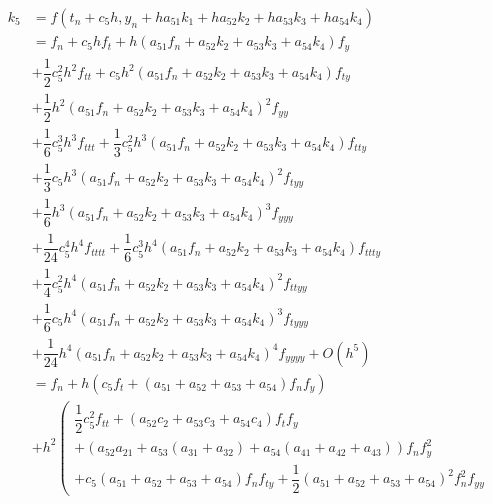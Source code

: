 \documentclass[a4paper,oneside]{book}
\numberwithin{equation}{chapter}
\begin{document}
\begin{align}
{k_5} &= f\left( {{t_n} + {c_5}h,{y_n} + h{a_{51}}{k_1} + h{a_{52}}{k_2} + h{a_{53}}{k_3} + h{a_{54}}{k_4}} \right)\\
& = {f_n} + {c_5}h{f_t} + h\left( {{a_{51}}{f_n} + {a_{52}}{k_2} + {a_{53}}{k_3} + {a_{54}}{k_4}} \right){f_y}\\
& + \dfrac{1}{2}c_5^2{h^2}{f_{tt}} + {c_5}{h^2}\left( {{a_{51}}{f_n} + {a_{52}}{k_2} + {a_{53}}{k_3} + {a_{54}}{k_4}} \right){f_{ty}}\\
& + \dfrac{1}{2}{h^2}{\left( {{a_{51}}{f_n} + {a_{52}}{k_2} + {a_{53}}{k_3} + {a_{54}}{k_4}} \right)^2}{f_{yy}}\\
& + \dfrac{1}{6}c_5^3{h^3}{f_{ttt}} + \dfrac{1}{3}c_5^2{h^3}\left( {{a_{51}}{f_n} + {a_{52}}{k_2} + {a_{53}}{k_3} + {a_{54}}{k_4}} \right){f_{tty}}\\
& + \dfrac{1}{3}{c_5}{h^3}{\left( {{a_{51}}{f_n} + {a_{52}}{k_2} + {a_{53}}{k_3} + {a_{54}}{k_4}} \right)^2}{f_{tyy}}\\
& + \dfrac{1}{6}{h^3}{\left( {{a_{51}}{f_n} + {a_{52}}{k_2} + {a_{53}}{k_3} + {a_{54}}{k_4}} \right)^3}{f_{yyy}}\\
& + \dfrac{1}{{24}}c_5^4{h^4}{f_{tttt}} + \dfrac{1}{6}c_5^3{h^4}\left( {{a_{51}}{f_n} + {a_{52}}{k_2} + {a_{53}}{k_3} + {a_{54}}{k_4}} \right){f_{ttty}}\\
& + \dfrac{1}{4}c_5^2{h^4}{\left( {{a_{51}}{f_n} + {a_{52}}{k_2} + {a_{53}}{k_3} + {a_{54}}{k_4}} \right)^2}{f_{ttyy}}\\
& + \dfrac{1}{6}{c_5}{h^4}{\left( {{a_{51}}{f_n} + {a_{52}}{k_2} + {a_{53}}{k_3} + {a_{54}}{k_4}} \right)^3}{f_{tyyy}}\\
& + \dfrac{1}{{24}}{h^4}{\left( {{a_{51}}{f_n} + {a_{52}}{k_2} + {a_{53}}{k_3} + {a_{54}}{k_4}} \right)^4}{f_{yyyy}} + O\left( {{h^5}} \right)\\
& = {f_n} + h\left( {{c_5}{f_t} + \left( {{a_{51}} + {a_{52}} + {a_{53}} + {a_{54}}} \right){f_n}{f_y}} \right)\\
& + {h^2}\left( \begin{array}{l}
\dfrac{1}{2}c_5^2{f_{tt}} + \left( {{a_{52}}{c_2} + {a_{53}}{c_3} + {a_{54}}{c_4}} \right){f_t}{f_y}\\
 + \left( {{a_{52}}{a_{21}} + {a_{53}}\left( {{a_{31}} + {a_{32}}} \right) + {a_{54}}\left( {{a_{41}} + {a_{42}} + {a_{43}}} \right)} \right){f_n}f_y^2\\
 + {c_5}\left( {{a_{51}} + {a_{52}} + {a_{53}} + {a_{54}}} \right){f_n}{f_{ty}} + \dfrac{1}{2}{\left( {{a_{51}} + {a_{52}} + {a_{53}} + {a_{54}}} \right)^2}f_n^2{f_{yy}}

\end{array}
\end{align}
\end{document}
